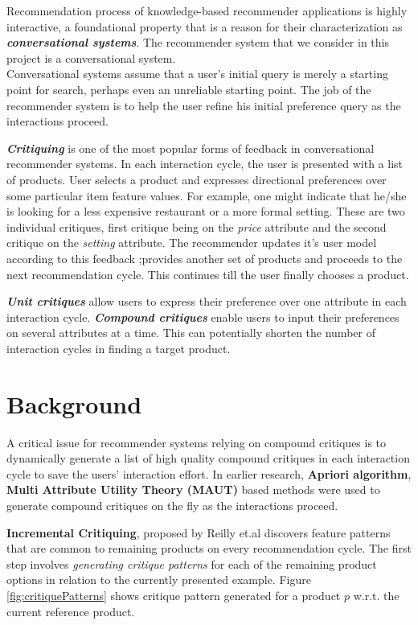 \documentclass{llncs}
\begin{document}
Recommendation process of knowledge-based recommender applications is highly interactive, a foundational property that is a reason for their characterization as \textit{\textbf{conversational systems}}. The recommender system that we consider in this project is a conversational system.\\
Conversational systems assume that a user's initial query is merely a starting point for search, perhaps even an unreliable starting point. The job of the recommender system is to help the user refine his initial preference query as the interactions proceed.

\textit{\textbf{Critiquing}} is one of the most popular forms of feedback in conversational recommender systems. In each interaction cycle, the user is presented with a list of products.
User selects a product and expresses directional preferences over some particular item feature values. For example, one might indicate that he/she is looking for a less expensive restaurant or a more formal setting. These are two individual critiques, first critique being on the \textit{price} attribute and the second critique on the \textit{setting} attribute. The recommender updates it's user model according to this feedback ;provides another set of products and proceeds to the next recommendation cycle. This continues till the user finally chooses a product.

\textit{\textbf{Unit critiques}} allow users to express their preference over one attribute in each interaction cycle. \textit{\textbf{Compound critiques}} enable users to input their preferences on several attributes at a time. This can potentially shorten the number of interaction cycles in finding a target product.



\section{Background}
      A critical issue for recommender systems relying on compound critiques is to dynamically generate a list of high quality compound critiques in each interaction cycle to save the users' interaction effort. In earlier research, \textbf{Apriori algorithm}, \textbf{Multi Attribute Utility Theory (MAUT)} based methods were used to generate compound critiques on the fly as the interactions proceed.

\textbf{Incremental Critiquing}, proposed by Reilly et.al \cite{reilly} discovers feature patterns that are common to remaining products on every recommendation cycle.
The first step involves \textit{generating critique patterns} for each of the remaining product options in relation to the currently presented example. Figure \ref{fig:critiquePatterns}  shows critique pattern generated for a product $p$ w.r.t. the current reference product.
\end{document}
